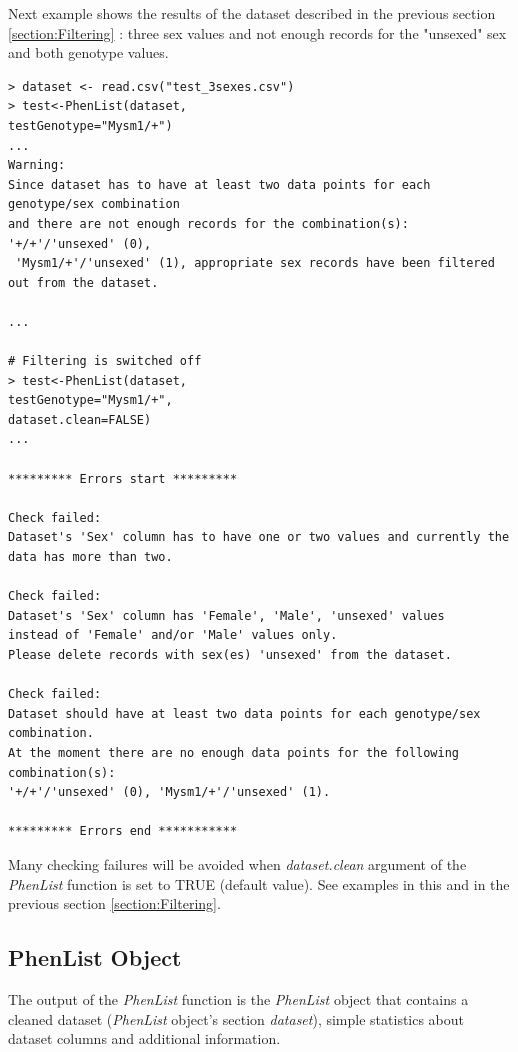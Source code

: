 \documentclass[12pt,a4paper]{article}
\begin{document}
Next example shows the results of the dataset described in the previous section \ref{section:Filtering} : three sex values and not enough records for the "unsexed" sex and both genotype values.

\begingroup
    \fontsize{8pt}{12pt}\selectfont
\begin{verbatim}
> dataset <- read.csv("test_3sexes.csv")
> test<-PhenList(dataset,
testGenotype="Mysm1/+")
...
Warning:
Since dataset has to have at least two data points for each genotype/sex combination 
and there are not enough records for the combination(s): '+/+'/'unsexed' (0),
 'Mysm1/+'/'unsexed' (1), appropriate sex records have been filtered out from the dataset.

...

# Filtering is switched off
> test<-PhenList(dataset,
testGenotype="Mysm1/+",
dataset.clean=FALSE)
...

********* Errors start *********

Check failed:
Dataset's 'Sex' column has to have one or two values and currently the data has more than two.

Check failed:
Dataset's 'Sex' column has 'Female', 'Male', 'unsexed' values 
instead of 'Female' and/or 'Male' values only. 
Please delete records with sex(es) 'unsexed' from the dataset.

Check failed:
Dataset should have at least two data points for each genotype/sex combination. 
At the moment there are no enough data points for the following combination(s): 
'+/+'/'unsexed' (0), 'Mysm1/+'/'unsexed' (1).

********* Errors end ***********

\end{verbatim}
\endgroup

Many checking failures will be avoided when \textit{dataset.clean} argument of the \textit{PhenList} function is set to TRUE (default value). See examples in this and in the previous section \ref{section:Filtering}.

\subsection{PhenList Object}
The output of the \textit{PhenList} function is the \textit{PhenList} object that contains a cleaned dataset (\textit{PhenList} object's section \textit{dataset}), simple statistics about dataset columns and additional information. 
\end{document}

